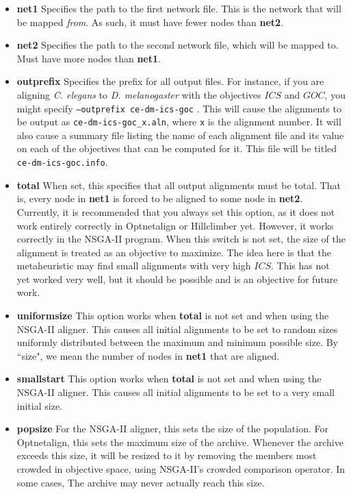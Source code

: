 \documentclass[11pt]{article} %
\begin{document}
\begin{itemize}
\item \textbf{net1} Specifies the path to the first network file. This is the network that will be mapped \textit{from}. As such, it must have fewer nodes than \textbf{net2}. 
\item \textbf{net2} Specifies the path to the second network file, which will be mapped to. Must have more nodes than \textbf{net1}. 
\item \textbf{outprefix} Specifies the prefix for all output files. For instance, if you are aligning \textit{C. elegans} to \textit{D. melanogaster} with the objectives \(ICS\) and \(GOC\), you might specify  \texttt{--outprefix ce-dm-ics-goc} . This will cause the alignments to be output as  \texttt{ce-dm-ics-goc\_x.aln}, where \texttt{x} is the alignment number. It will also cause a summary file listing the name of each alignment file and its value on each of the objectives that can be computed for it. This file will be titled \texttt{ce-dm-ics-goc.info}.
\item \textbf{total} When set, this specifies that all output alignments must be total. That is, every node in \textbf{net1} is forced to be aligned to some node in \textbf{net2}. Currently, it is recommended that you always set this option, as it does not work entirely correctly in Optnetalign or Hillclimber yet. However, it works correctly in the NSGA-II program. When this switch is not set, the size of the alignment is treated as an objective to maximize. The idea here is that the metaheuristic may find small alignments with very high \(ICS\). This has not yet worked very well, but it should be possible and is an objective for future work.
\item \textbf{uniformsize} This option works when \textbf{total} is not set and when using the NSGA-II aligner. This causes all initial alignments to be set to random sizes uniformly distributed between the maximum and minimum possible size. By ``size", we mean the number of nodes in \textbf{net1} that are aligned.
\item \textbf{smallstart} This option works when \textbf{total} is not set and when using the NSGA-II aligner. This causes all initial alignments to be set to a very small initial size.
\item \textbf{popsize} For the NSGA-II aligner, this sets the size of the population. For Optnetalign, this sets the maximum size of the archive. Whenever the archive exceeds this size, it will be resized to it by removing the members most crowded in objective space, using NSGA-II's crowded comparison operator. In some cases, The archive may never actually reach this size.

\end{itemize}
\end{document}
